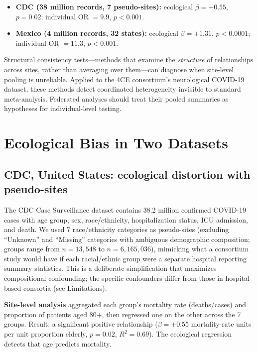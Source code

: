 \documentclass[11pt]{article}
\begin{document}
\begin{itemize}
\item \textbf{CDC (38 million records, 7 pseudo-sites):} ecological
$\beta = +0.55$, $p = 0.02$; individual OR $= 9.9$, $p < 0.001$.

\item \textbf{Mexico (4 million records, 32 states):} ecological
$\beta = +1.31$, $p < 0.0001$; individual OR $= 11.3$, $p < 0.001$.
\end{itemize}

Structural consistency tests---methods
that examine the \emph{structure} of relationships across sites, rather than
averaging over them---can diagnose when site-level pooling is unreliable.
Applied to the 4CE consortium's neurological COVID-19 dataset, these methods
detect coordinated heterogeneity invisible to standard meta-analysis.
Federated analyses should treat their pooled summaries as hypotheses for
individual-level testing.


\section{Ecological Bias in Two Datasets}

\subsection{CDC, United States: ecological distortion with pseudo-sites}

The CDC Case Surveillance dataset contains 38.2 million confirmed COVID-19
cases with age group, sex, race/ethnicity, hospitalization status, ICU
admission, and death.  We used 7 race/ethnicity categories as pseudo-sites
(excluding ``Unknown'' and ``Missing'' categories with ambiguous demographic
composition; groups range from $n = 13{,}548$ to $n = 6{,}165{,}036$),
mimicking what a consortium study would have if each racial/ethnic group
were a separate hospital reporting summary statistics.  This is a deliberate
simplification that maximizes compositional confounding; the specific
confounders differ from those in hospital-based consortia (see Limitations).

\textbf{Site-level analysis} aggregated each group's mortality rate
(deaths/cases) and proportion of patients aged 80+, then regressed one on the
other across the 7 groups.  Result: a significant positive relationship
($\beta = +0.55$ mortality-rate units per unit proportion elderly,
$p = 0.02$, $R^2 = 0.69$).  The ecological regression detects that age
predicts mortality.
\end{document}
